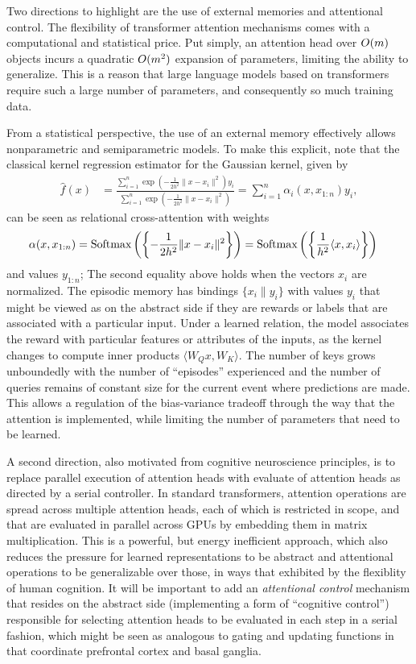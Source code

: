Two directions to highlight are the use of external memories and attentional control. The flexibility of transformer attention mechanisms comes with a computational and statistical price. Put simply, an attention head over 
$O(m)$ objects incurs a quadratic $O(m^2)$ expansion of parameters, limiting the ability to generalize. This is a reason that large language models based on transformers require such a large number of parameters, and consequently so much training data. 

From a statistical perspective, the use of an external memory effectively allows nonparametric and semiparametric models. To make this explicit, note that the classical kernel regression estimator for the Gaussian kernel,
given by
\begin{align*}
  \hat f(x) &= \frac{\sum_{i=1}^n \exp\left(-\frac{1}{2h^2} \|x-x_i\|^2\right) y_i}{\sum_{i=1}^n \exp\left(-\frac{1}{2h^2} \|x-x_i\|^2\right)} 
  = \sum_{i=1}^n \alpha_i(x, x_{1:n}) y_i,
\end{align*}
can be seen as relational cross-attention with weights
\begin{align*}
    \alpha(x, x_{1:n}) &= \Softmax\left(\left\{-\frac{1}{2h^2}\|x-x_i\|^2\right\}\right) 
    = \Softmax\left(\left\{\frac{1}{h^2}\langle x, x_i\rangle\right\}\right)
\end{align*}
and values $y_{1:n}$; The second equality above holds when the vectors $x_i$ are normalized.
The episodic memory has bindings $\{x_i\| y_i\}$ with values $y_i$ that 
might be viewed as on the abstract side if they are rewards or labels that are associated with 
a particular input. Under a learned relation, the model associates the reward with particular features or attributes of the inputs, as the kernel changes to compute inner products $\langle W_Q x, W_K \rangle$. 
The number of keys grows unboundedly with the number of ``episodes'' experienced 
and the number of queries remains of constant size for the current event where predictions are made.
This allows a regulation of the bias-variance tradeoff through the way that the attention is implemented, 
while limiting the number of parameters that need to be learned.

A second direction, also motivated from cognitive neuroscience principles, is to replace 
parallel execution of attention heads with evaluate of attention heads as directed by a serial controller. 
In standard transformers, attention operations are spread across multiple attention heads,
each of which is restricted in scope, and that are evaluated in parallel across GPUs by embedding them in matrix multiplication. This is a powerful, but energy inefficient approach, which also reduces the pressure for learned representations to be abstract and attentional operations to be generalizable over those, in ways that exhibited by the flexiblity of human cognition.  It will be important to add an {\it attentional control} mechanism that resides on the abstract side (implementing a form of ``cognitive control'') responsible for selecting attention heads to be evaluated in each step in a serial fashion, which might be seen as analogous to gating and updating functions 
in that coordinate prefrontal cortex and basal ganglia.

